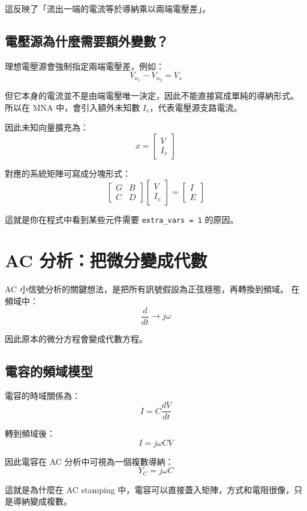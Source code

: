 \documentclass[12pt,a4paper]{article}
\begin{document}
這反映了「流出一端的電流等於導納乘以兩端電壓差」。

\subsection{電壓源為什麼需要額外變數？}

理想電壓源會強制指定兩端電壓差，例如：
\[
V_{n_1} - V_{n_2} = V_s
\]

但它本身的電流並不是由端電壓唯一決定，因此不能直接寫成單純的導納形式。  
所以在 MNA 中，會引入額外未知數 $I_v$，代表電壓源支路電流。

因此未知向量擴充為：
\[
x =
\begin{bmatrix}
V \\
I_v
\end{bmatrix}
\]

對應的系統矩陣可寫成分塊形式：
\[
\begin{bmatrix}
G & B \\
C & D
\end{bmatrix}
\begin{bmatrix}
V \\
I_v
\end{bmatrix}
=
\begin{bmatrix}
I \\
E
\end{bmatrix}
\]

這就是你在程式中看到某些元件需要 \verb|extra_vars = 1| 的原因。

\section{AC 分析：把微分變成代數}

AC 小信號分析的關鍵想法，是把所有訊號假設為正弦穩態，再轉換到頻域。  
在頻域中：
\[
\frac{d}{dt} \longrightarrow j\omega
\]

因此原本的微分方程會變成代數方程。

\subsection{電容的頻域模型}

電容的時域關係為：
\[
I = C \frac{dV}{dt}
\]

轉到頻域後：
\[
I = j\omega C V
\]

因此電容在 AC 分析中可視為一個複數導納：
\[
Y_C = j\omega C
\]

這就是為什麼在 AC stamping 中，電容可以直接蓋入矩陣，方式和電阻很像，只是導納變成複數。
\end{document}
